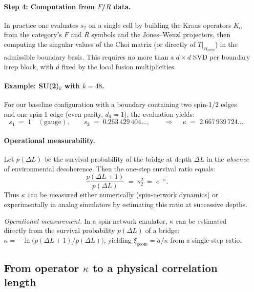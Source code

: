 \documentclass[11pt]{article}
\theoremstyle{plain}
\theoremstyle{definition}
\begin{document}
\paragraph{Step 4: Computation from $F$/$R$ data.}
In practice one evaluates $s_2$ on a single cell by building the Kraus operators $K_\alpha$ from the category's $F$ and $R$ symbols and the Jones--Wenzl projectors, then computing the singular values of the Choi matrix (or directly of $T|_{H_{\mathrm{phys}}}$) in the admissible boundary basis. This requires no more than a $d\times d$ SVD per boundary irrep block, with $d$ fixed by the local fusion multiplicities.

\paragraph{Example: SU(2)$_k$ with $k=48$.}
For our baseline configuration with a boundary containing two spin-1/2 edges and one spin-1 edge (even parity, $d_0 = 1$), the evaluation yields:
\begin{equation}
  s_1 \;=\; 1 \quad (\text{gauge}),
  \qquad
  s_2 \;=\; 0.263\,429\,404\ldots,
  \qquad
  \Rightarrow\quad
  \boxed{\ \kappa \;=\; 2.667\,939\,724\ldots\ }
  \label{eq:kappa-numeric}
\end{equation}

\paragraph{Operational measurability.}
Let $p(\Delta L)$ be the survival probability of the bridge at depth $\Delta L$ in the \emph{absence} of environmental decoherence. Then the one-step survival ratio equals:
\begin{equation}
  \frac{p(\Delta L+1)}{p(\Delta L)} \;=\; s_2^2 \;=\; e^{-\kappa}.
  \label{eq:survival-ratio}
\end{equation}
Thus $\kappa$ can be measured either numerically (spin-network dynamics) or experimentally in analog simulators by estimating this ratio at successive depths.

\noindent\emph{Operational measurement.} In a spin-network emulator, $\kappa$ can be estimated directly from the survival probability $p(\Delta L)$ of a bridge: $\kappa = -\ln\!\big(p(\Delta L{+}1)/p(\Delta L)\big)$, yielding $\xi_{\mathrm{geom}}=a/\kappa$ from a single-step ratio.

\subsection{From operator \texorpdfstring{$\kappa$}{kappa} to a physical correlation length}\label{subsec:kappa-corrlen}
\end{document}
